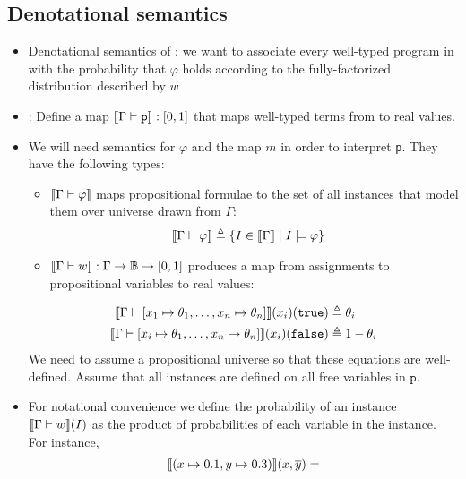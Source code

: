 \documentclass{tufte-handout}
\begin{document}
\subsection{Denotational semantics}
\begin{itemize}
  \item Denotational semantics of \prop{}: we want to associate every well-typed
  program in \prop{} with the probability that $\varphi$ holds according to the
  fully-factorized distribution described by $w$


  \item {}: Define a map $\llbracket {\Gamma \vdash \texttt{p}} \rrbracket : [0,1]$ that maps well-typed terms from 
  \prop{} to real values. 
  \item We will need semantics for $\varphi$ and the map $m$ in order to
  interpret \texttt{p}. 
  They have the following types:
  \begin{itemize}
    \item $\llbracket {\Gamma \vdash \varphi} \rrbracket$ maps propositional formulae to the
    set of all instances that model them over universe drawn from $\Gamma$:
    \begin{align}
     \llbracket {\Gamma \vdash \varphi} \rrbracket &\triangleq \{I \in \llbracket {\Gamma} \rrbracket \mid I \models \varphi \}
    \end{align}
    \item $\llbracket {\Gamma \vdash w} \rrbracket : \Gamma \rightarrow \mathbb{B} \rightarrow [0, 1]$ produces a
    map from assignments to propositional variables to real values:
  \end{itemize}
  \begin{align}
    \llbracket {\Gamma \vdash [x_1 \mapsto \theta_1, \dots, x_n \mapsto \theta_n]} \rrbracket(x_i)(\texttt{true}) &\triangleq \theta_i\\
    \llbracket {\Gamma \vdash [x_i \mapsto \theta_1, \dots, x_n \mapsto \theta_n]} \rrbracket(x_i)(\texttt{false}) &\triangleq 1-\theta_i
  \end{align}
  We need to assume a propositional universe so that these equations are well-defined.
  Assume that all instances are defined on all free variables in $\texttt{p}$.
  \item For notational convenience we define the probability of an instance $\llbracket {\Gamma \vdash w} \rrbracket(I)$
  as the product of probabilities of each variable in the instance. For
  instance,
  \begin{align*}
    \dbracket{(x \mapsto 0.1, y \mapsto 0.3)}(x, \overline{y}) = 

\end{align*}
\end{itemize}
\end{document}
